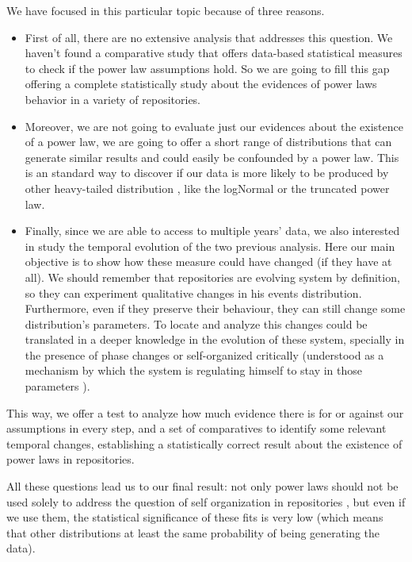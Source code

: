 \documentclass[conference]{IEEEtran}
\begin{document}
We have focused in this particular topic because of three
reasons.\begin{itemize}
\item First of all, there are no extensive analysis that addresses
  this question. We haven't found a comparative study that offers
  data-based statistical measures to check if the power law
  assumptions hold.  So we are going to fill this gap offering a
  complete statistically study about the evidences of power laws
  behavior in a variety of repositories.
\item Moreover, we are not going to evaluate just our evidences about
  the existence of a power law, we are going to offer a short range of
  distributions that can generate similar results and could easily be
  confounded by a power law. This is an standard way to discover if
  our data is more likely to be produced by other heavy-tailed
  distribution \cite{clauset2009power}, like the logNormal or the
  truncated power law.
\item Finally, since we are able to access to multiple years' data, we
  also interested in study the temporal evolution of the two previous
  analysis. Here our main objective is to show how these measure could
  have changed (if they have at all). We should remember that
  repositories are evolving system by definition, so they can
  experiment qualitative changes in his events
  distribution. Furthermore, even if they preserve their behaviour,
  they can still change some distribution's parameters.  To locate and
  analyze this changes could be translated in a deeper knowledge in
  the evolution of these system, specially in the presence of phase
  changes \cite{merelo2017self} or self-organized critically
  (understood as a mechanism by which the system is regulating himself
  to stay in those parameters \cite{newman2005power}).
\end{itemize}

This way, we offer a test to analyze how much evidence there is for or
against our assumptions in every step, and a set of comparatives to
identify some relevant temporal changes, establishing a statistically
correct result about the existence of power laws in repositories.

All these questions lead us to our final result: not only power laws
should not be used solely to address the question of self organization
in repositories \cite{alderson2010contrasting}, but even if we use
them, the statistical significance of these fits is very low (which
means that other distributions at least the same probability of being
generating the data).
\end{document}
